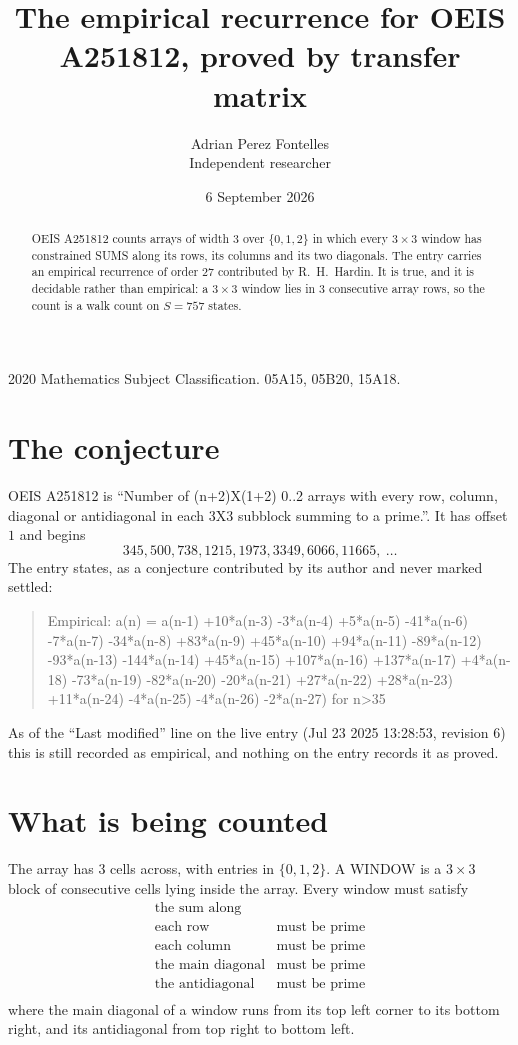 \documentclass[11pt,a4paper]{article}
\title{The empirical recurrence for OEIS A251812, proved by transfer matrix}
\author{Adrian Perez Fontelles\\ \small Independent researcher}
\date{6 September 2026}
\theoremstyle{plain}
\theoremstyle{definition}
\begin{document}
\maketitle

\begin{abstract}
OEIS A251812 counts arrays of width $3$ over $\{0,1,2\}$ in which every $3\times3$ window has
constrained SUMS along its rows, its columns and its two diagonals. The entry carries an
empirical recurrence of order $27$ contributed by R.~H.~Hardin. It is true, and it is
decidable rather than empirical: a $3\times3$ window lies in $3$ consecutive array rows,
so the count is a walk count on $S=757$ states.
\end{abstract}

\noindent\small 2020 Mathematics Subject Classification. 05A15, 05B20, 15A18.\normalsize

\section{The conjecture}

OEIS A251812 is ``Number of (n+2)X(1+2) 0..2 arrays with every row, column, diagonal or antidiagonal in each 3X3 subblock summing to a prime.''. It has offset $1$ and begins
\[
345, 500, 738, 1215, 1973, 3349, 6066, 11665,\ \dots
\]
The entry states, as a conjecture contributed by its author and never marked settled:
\begin{quote}
Empirical: a(n) = a(n-1) +10*a(n-3) -3*a(n-4) +5*a(n-5) -41*a(n-6) -7*a(n-7) -34*a(n-8) +83*a(n-9) +45*a(n-10) +94*a(n-11) -89*a(n-12) -93*a(n-13) -144*a(n-14) +45*a(n-15) +107*a(n-16) +137*a(n-17) +4*a(n-18) -73*a(n-19) -82*a(n-20) -20*a(n-21) +27*a(n-22) +28*a(n-23) +11*a(n-24) -4*a(n-25) -4*a(n-26) -2*a(n-27) for n>35
\end{quote}
As of the ``Last modified'' line on the live entry (Jul 23 2025 13:28:53, revision 6) this is still
recorded as empirical, and nothing on the entry records it as proved.

\section{What is being counted}

The array has $3$ cells across, with entries in $\{0,1,2\}$. A WINDOW is a $3\times3$ block
of consecutive cells lying inside the array. Every window must satisfy
\[
\begin{array}{ll}
\text{the sum along} & \text{} \\[2pt]
\text{each row} & \text{must be prime} \\
\text{each column} & \text{must be prime} \\
\text{the main diagonal} & \text{must be prime} \\
\text{the antidiagonal} & \text{must be prime} \\
\end{array}
\]
where the main diagonal of a window runs from its top left corner to its bottom right, and its
antidiagonal from top right to bottom left.
\end{document}
